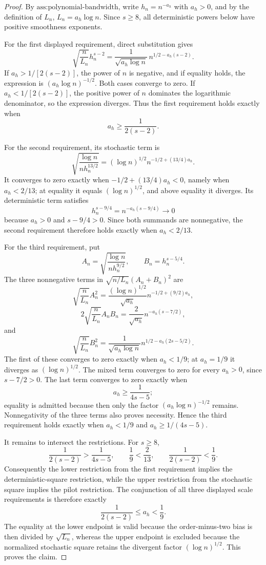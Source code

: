 \documentclass{article}
\begin{document}
\begin{proof}
By \(\text{ass:polynomial-bandwidth}\), write \(h_n=n^{-a_h}\) with \(a_h>0\), and by the definition of \(L_n\), \(L_n=a_h\log n\).  Since \(s\geq 8\), all deterministic powers below have positive smoothness exponents.

For the first displayed requirement, direct substitution gives
\[
 \sqrt{\frac{n}{L_n}}h_n^{s-2}
 =\frac{1}{\sqrt{a_h\log n}}\,n^{1/2-a_h(s-2)}.
\]
If \(a_h>1/[2(s-2)]\), the power of \(n\) is negative, and if equality holds, the expression is \((a_h\log n)^{-1/2}\).  Both cases converge to zero.  If \(a_h<1/[2(s-2)]\), the positive power of \(n\) dominates the logarithmic denominator, so the expression diverges.  Thus the first requirement holds exactly when
\[
 a_h\geq \frac{1}{2(s-2)}.
\]

For the second requirement, its stochastic term is
\[
 \sqrt{\frac{\log n}{n h_n^{13/2}}}
 = (\log n)^{1/2}n^{-1/2+(13/4)a_h}.
\]
It converges to zero exactly when \(-1/2+(13/4)a_h<0\), namely when \(a_h<2/13\); at equality it equals \((\log n)^{1/2}\), and above equality it diverges.  Its deterministic term satisfies
\[
 h_n^{s-9/4}=n^{-a_h(s-9/4)}\longrightarrow0
\]
because \(a_h>0\) and \(s-9/4>0\).  Since both summands are nonnegative, the second requirement therefore holds exactly when \(a_h<2/13\).

For the third requirement, put
\[
 A_n=\sqrt{\frac{\log n}{n h_n^{9/2}}},
 \qquad
 B_n=h_n^{s-5/4}.
\]
The three nonnegative terms in \(\sqrt{n/L_n}(A_n+B_n)^2\) are
\[
 \sqrt{\frac{n}{L_n}}A_n^2
 =\frac{(\log n)^{1/2}}{\sqrt{a_h}}
   n^{-1/2+(9/2)a_h},
\]
\[
 2\sqrt{\frac{n}{L_n}}A_nB_n
 =\frac{2}{\sqrt{a_h}}n^{-a_h(s-7/2)},
\]
and
\[
 \sqrt{\frac{n}{L_n}}B_n^2
 =\frac{1}{\sqrt{a_h\log n}}
   n^{1/2-a_h(2s-5/2)}.
\]
The first of these converges to zero exactly when \(a_h<1/9\); at \(a_h=1/9\) it diverges as \((\log n)^{1/2}\).  The mixed term converges to zero for every \(a_h>0\), since \(s-7/2>0\).  The last term converges to zero exactly when
\[
 a_h\geq \frac{1}{4s-5};
\]
equality is admitted because then only the factor \((a_h\log n)^{-1/2}\) remains.  Nonnegativity of the three terms also proves necessity.  Hence the third requirement holds exactly when \(a_h<1/9\) and \(a_h\geq1/(4s-5)\).

It remains to intersect the restrictions.  For \(s\geq8\),
\[
 \frac{1}{2(s-2)}>\frac{1}{4s-5},
 \qquad
 \frac{1}{9}<\frac{2}{13},
 \qquad
 \frac{1}{2(s-2)}<\frac{1}{9}.
\]
Consequently the lower restriction from the first requirement implies the deterministic-square restriction, while the upper restriction from the stochastic square implies the pilot restriction.  The conjunction of all three displayed scale requirements is therefore exactly
\[
 \frac{1}{2(s-2)}\leq a_h<\frac{1}{9}.
\]
The equality at the lower endpoint is valid because the order-minus-two bias is then divided by \(\sqrt{L_n}\), whereas the upper endpoint is excluded because the normalized stochastic square retains the divergent factor \((\log n)^{1/2}\).  This proves the claim.
\end{proof}
\end{document}
